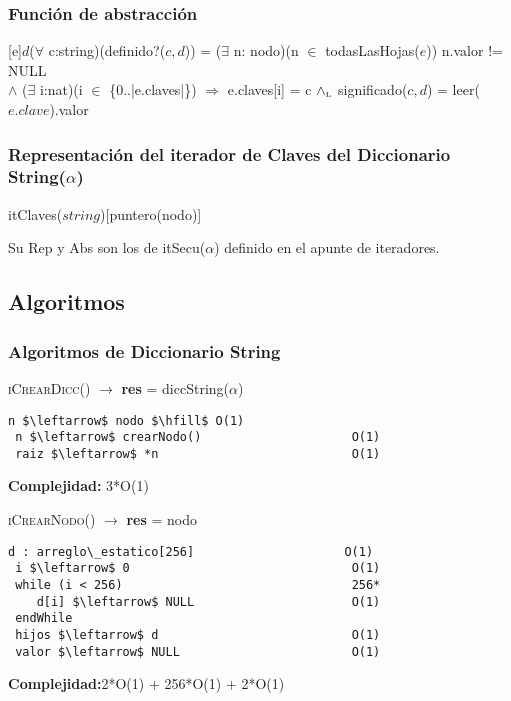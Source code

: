 
\subsubsection{Funci\'on de abstracci\'on}
 [e]{$d$}{($\forall$ c:string)(definido?($c,d$)) = ($\exists$ n: nodo)(n $\in$ todasLasHojas($e$)) n.valor != NULL \\ $\land$ ($\exists$ i:nat)(i $\in$ \{0..|e.claves|\}) $\Rightarrow$ e.claves[i] = c $\land_{\mathrm{\scriptscriptstyle{L}}}$ significado($c,d$) = leer($e.clave$).valor}
 
  \subsubsection{Representaci\'on del iterador de Claves del Diccionario String($\alpha$)}



    \begin{Estructura}{itClaves($string$)}[puntero(nodo)]
    \end{Estructura}

    Su Rep y Abs son los de itSecu($\alpha$) definido en el apunte de iteradores.

  \subsection{Algoritmos}
\subsubsection{Algoritmos de Diccionario String}

\textsc{iCrearDicc}() $\rightarrow$ \textbf{res} = diccString($\alpha$)
\begin{lstlisting}[mathescape]
 n $\leftarrow$ nodo $\hfill$ O(1)
 n $\leftarrow$ crearNodo() 					O(1)
 raiz $\leftarrow$ *n 							O(1)
\end{lstlisting}
\textbf{Complejidad:} 3*O(1)

\textsc{iCrearNodo}() $\rightarrow$ \textbf{res} = nodo
\begin{lstlisting}[mathescape]
 d : arreglo\_estatico[256] 					O(1)
 i $\leftarrow$ 0 								O(1)
 while (i < 256) 								256*
 	d[i] $\leftarrow$ NULL 						O(1)
 endWhile
 hijos $\leftarrow$ d 							O(1)
 valor $\leftarrow$ NULL 						O(1)
\end{lstlisting}
\textbf{Complejidad:}2*O(1) + 256*O(1) + 2*O(1)

